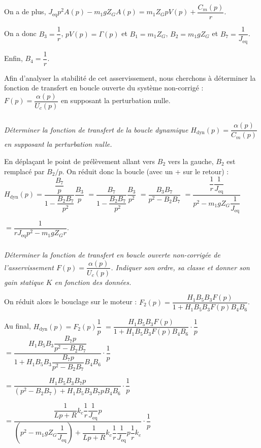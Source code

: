 \begin{multicols}{2}
\begin{corrige}
On a de plus, $J_{\text{eq}} p^2 A(p) -m_1gZ_GA(p)=m_1 Z_G p V(p) +\dfrac{C_m(p)}{r}$.

On a donc $B_3 = \dfrac{1}{r}$, $p V(p) = \Gamma(p)$ et $B_1 = m_1 Z_G$, $B_2 =m_1gZ_G$ et $B_7 = \dfrac{1}{J_{\text{eq}}}$.

Enfin, $B_4 = \dfrac{1}{r}$.

\end{corrige}
\else
\fi

\ifprof
\else
Afin d'analyser la stabilité de cet asservissement, nous cherchons à déterminer la fonction de transfert en
boucle ouverte du système non-corrigé : $ F(p)= \dfrac{\alpha (p)}{U_c (p)}$ en supposant la perturbation nulle.
\fi

\subparagraph{} \textit{Déterminer la fonction de transfert de la boucle dynamique $H_{\text{dyn}}(p)=\dfrac{\alpha (p)}{C_m(p)}$ en supposant la perturbation nulle.}
\ifprof
\begin{corrige}
En déplaçant le point de prélèvement allant vers $B_2$ vers la gauche, $B_2$ est remplacé par $B_2/p$. On réduit donc la boucle (avec un + sur le retour) : $H_{\text{dyn}}(p)=\dfrac{\dfrac{B_7}{p}}{1-\dfrac{B_2B_7}{p^2}}\dfrac{B_3}{p}$ $=\dfrac{B_7}{1-\dfrac{B_2B_7}{p^2}}\dfrac{B_3}{p^2}$
 $=\dfrac{B_3B_7}{p^2-B_2B_7}$
  $=\dfrac{\dfrac{1}{r}\dfrac{1}{J_{\text{eq}}}}{p^2-m_1gZ_G\dfrac{1}{J_{\text{eq}}}}$
  
    $=\dfrac{1}{r J_{\text{eq}}p^2-m_1gZ_Gr}$.


\end{corrige}
\else
\fi


\subparagraph{} \textit{Déterminer la fonction de transfert en boucle ouverte non-corrigée de l'asservissement $ F(p)= \dfrac{\alpha (p)}{U_c (p)}$.
Indiquer son ordre, sa classe et donner son gain statique $K$ en fonction des données.}
\ifprof
\begin{corrige}

On réduit alors le bouclage sur le moteur : $F_2(p)=\dfrac{H_1B_5B_3 F(p)}{1+H_1B_5B_3 F(p)B_4 B_6}$. 

Au final, $H_{\text{dyn}}(p) = F_2 (p)\dfrac{1}{p}$ $=\dfrac{H_1B_5B_3 F(p)}{1+H_1B_5B_3 F(p)B_4 B_6} \cdot\dfrac{1}{p}$ $=\dfrac{H_1B_5B_3 \dfrac{B_7 p}{p^2-B_2B_7}}{1+H_1B_5B_3 \dfrac{B_7 p}{p^2-B_2B_7}B_4 B_6} \cdot\dfrac{1}{p}$

$=\dfrac{H_1B_5B_3 B_7 p}{\left(p^2-B_2B_7 \right)+H_1B_5B_3 B_7 pB_4 B_6} \cdot\dfrac{1}{p}$

$=\dfrac{\dfrac{1}{Lp + R}k_c\dfrac{1}{r} \dfrac{1}{J_{\text{eq}}} p}{\left(p^2-m_1gZ_G\dfrac{1}{J_{\text{eq}}} \right)+\dfrac{1}{Lp + R}k_c\dfrac{1}{r} \dfrac{1}{J_{\text{eq}}} p\dfrac{1}{r} k_e} \cdot\dfrac{1}{p}$


\end{corrige}
\end{multicols}
